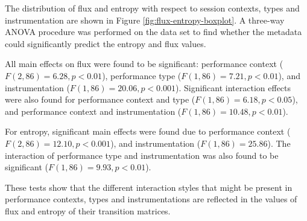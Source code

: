 \documentclass{sigchi}
\begin{document}
The distribution of flux and entropy with respect to session contexts,
types and instrumentation are shown in Figure
\ref{fig:flux-entropy-boxplot}. A three-way ANOVA procedure was
performed on the data set to find whether the metadata could
significantly predict the entropy and flux values.

All main effects on flux were found to be significant: performance
context ($F(2,86) = 6.28, p < 0.01$), performance type
($F(1,86) = 7.21, p < 0.01$), and instrumentation
($F(1,86) = 20.06, p < 0.001$). Significant interaction effects were
also found for performance context and type
($F(1,86) = 6.18, p < 0.05$), and performance context and
instrumentation ($F(1,86) = 10.48, p < 0.01$).

For entropy, significant main effects were found due to performance
context ($F(2,86) = 12.10, p < 0.001$), and instrumentation
($F(1,86) = 25.86$). The interaction of performance type and
instrumentation was also found to be significant
($F(1,86) = 9.93, p<0.01$).

These tests show that the different interaction styles that might be
present in performance contexts, types and instrumentations are
reflected in the values of flux and entropy of their transition
matrices.
\end{document}
